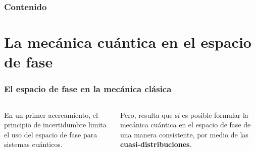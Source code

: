 \documentclass[10pt, spanish]{beamer}
\DeclareMathOperator{\R}{\mathbb{R}}
\begin{document}
  \begin{frame}
    \frametitle{Contenido}
    \tableofcontents
  \end{frame}

  \section{La mecánica cuántica en el espacio de fase}

  \begin{frame}
    \frametitle{El espacio de fase en la mecánica clásica}

    \begin{columns}

      En un primer acercamiento, el principio de
      incertidumbre limita el uso del espacio de fase para
      sistemas cuánticos.

      \vspace{10pt}

      \pause

      Pero, resulta que sí es posible formular la mecánica
      cuántica en el espacio de fase de una manera
      consistente, por medio de las
      \textbf{cuasi-distribuciones}.
    \end{columns}
  \end{frame}


\end{document}
